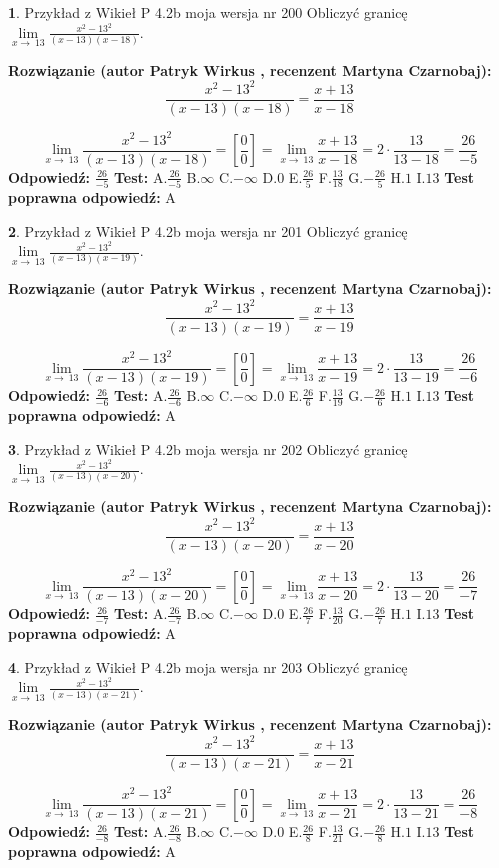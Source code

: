 \documentclass[12pt, a4paper]{article}
\theoremstyle{definition} %
\newtheorem{zad}{}
\newcommand{\zadStart}[1]{\begin{zad}#1\newline}
\newcommand{\zadStop}{\end{zad}}
\newcommand{\rozwStart}[2]{\noindent \textbf{Rozwiązanie (autor #1 , recenzent #2): }\newline}
\newcommand{\rozwStop}{\newline}
\newcommand{\odpStart}{\noindent \textbf{Odpowiedź:}\newline}
\newcommand{\odpStop}{\newline}
\newcommand{\testStart}{\noindent \textbf{Test:}\newline}
\newcommand{\testStop}{\newline}
\newcommand{\kluczStart}{\noindent \textbf{Test poprawna odpowiedź:}\newline}
\newcommand{\kluczStop}{\newline}
\begin{document}
\zadStart{Przykład z Wikieł P 4.2b moja wersja nr 200}
Obliczyć granicę $\lim\limits_{x\to\ 13}\frac{x^{2}-13^{2}}{(x-13)(x-18)}$.
\zadStop
\rozwStart{Patryk Wirkus}{Martyna Czarnobaj}
$$\frac{x^{2}-13^{2}}{(x-13)(x-18)}=\frac{x+13}{x-18}$$

$$\lim\limits_{x\to\ 13}\frac{x^{2}-13^{2}}{(x-13)(x-18)}=[\frac{0}{0}]=\lim\limits_{x\to\ 13}\frac{x+13}{x-18}=2 \cdot \frac{13}{13-18} = \frac{26}{-5}$$
\rozwStop
\odpStart
$\frac{26}{-5}$
\odpStop
\testStart
A.$\frac{26}{-5}$
B.$\infty$
C.$-\infty$
D.$0$
E.$\frac{26}{5}$
F.$\frac{13}{18}$
G.$-\frac{26}{5}$
H.$1$
I.$13$
\testStop
\kluczStart
A
\kluczStop



\zadStart{Przykład z Wikieł P 4.2b moja wersja nr 201}
Obliczyć granicę $\lim\limits_{x\to\ 13}\frac{x^{2}-13^{2}}{(x-13)(x-19)}$.
\zadStop
\rozwStart{Patryk Wirkus}{Martyna Czarnobaj}
$$\frac{x^{2}-13^{2}}{(x-13)(x-19)}=\frac{x+13}{x-19}$$

$$\lim\limits_{x\to\ 13}\frac{x^{2}-13^{2}}{(x-13)(x-19)}=[\frac{0}{0}]=\lim\limits_{x\to\ 13}\frac{x+13}{x-19}=2 \cdot \frac{13}{13-19} = \frac{26}{-6}$$
\rozwStop
\odpStart
$\frac{26}{-6}$
\odpStop
\testStart
A.$\frac{26}{-6}$
B.$\infty$
C.$-\infty$
D.$0$
E.$\frac{26}{6}$
F.$\frac{13}{19}$
G.$-\frac{26}{6}$
H.$1$
I.$13$
\testStop
\kluczStart
A
\kluczStop



\zadStart{Przykład z Wikieł P 4.2b moja wersja nr 202}
Obliczyć granicę $\lim\limits_{x\to\ 13}\frac{x^{2}-13^{2}}{(x-13)(x-20)}$.
\zadStop
\rozwStart{Patryk Wirkus}{Martyna Czarnobaj}
$$\frac{x^{2}-13^{2}}{(x-13)(x-20)}=\frac{x+13}{x-20}$$

$$\lim\limits_{x\to\ 13}\frac{x^{2}-13^{2}}{(x-13)(x-20)}=[\frac{0}{0}]=\lim\limits_{x\to\ 13}\frac{x+13}{x-20}=2 \cdot \frac{13}{13-20} = \frac{26}{-7}$$
\rozwStop
\odpStart
$\frac{26}{-7}$
\odpStop
\testStart
A.$\frac{26}{-7}$
B.$\infty$
C.$-\infty$
D.$0$
E.$\frac{26}{7}$
F.$\frac{13}{20}$
G.$-\frac{26}{7}$
H.$1$
I.$13$
\testStop
\kluczStart
A
\kluczStop



\zadStart{Przykład z Wikieł P 4.2b moja wersja nr 203}
Obliczyć granicę $\lim\limits_{x\to\ 13}\frac{x^{2}-13^{2}}{(x-13)(x-21)}$.
\zadStop
\rozwStart{Patryk Wirkus}{Martyna Czarnobaj}
$$\frac{x^{2}-13^{2}}{(x-13)(x-21)}=\frac{x+13}{x-21}$$

$$\lim\limits_{x\to\ 13}\frac{x^{2}-13^{2}}{(x-13)(x-21)}=[\frac{0}{0}]=\lim\limits_{x\to\ 13}\frac{x+13}{x-21}=2 \cdot \frac{13}{13-21} = \frac{26}{-8}$$
\rozwStop
\odpStart
$\frac{26}{-8}$
\odpStop
\testStart
A.$\frac{26}{-8}$
B.$\infty$
C.$-\infty$
D.$0$
E.$\frac{26}{8}$
F.$\frac{13}{21}$
G.$-\frac{26}{8}$
H.$1$
I.$13$
\testStop
\kluczStart
A
\kluczStop
\end{document}
